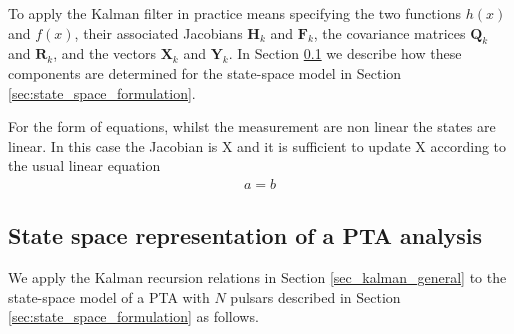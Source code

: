 \documentclass[fleqn,usenatbib,useAMS]{mnras}
\begin{document}
To apply the Kalman filter in practice means specifying the two functions $h(x)$ and $f(x)$, their associated Jacobians $\boldsymbol{H}_k$ and $\boldsymbol{F}_k$, the covariance matrices $\boldsymbol{Q}_k$ and $\boldsymbol{R}_k$, and the vectors $\boldsymbol{X}_k$
and $\boldsymbol{Y}_k$. In Section \ref{sec_kalman_specific} we describe how these components are determined for the state-space model in Section \ref{sec:state_space_formulation}. 







For the form of equations, whilst the measurement are non linear the states are linear. In this case the Jacobian is X and it is sufficient to update X according to the usual linear equation 
\begin{eqnarray}
	a = b \label{eq:linear_state_evolution}
\end{eqnarray}


\subsection{State space representation of a PTA analysis}\label{sec_kalman_specific}
We apply the Kalman recursion relations in Section \ref{sec_kalman_general} to the state-space model of a PTA with $N$ pulsars described in Section \ref{sec:state_space_formulation} as follows. \newline 
\end{document}
